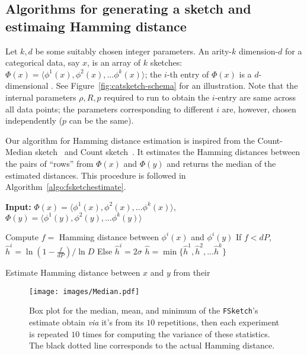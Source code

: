 \subsection{Algorithms for generating a sketch and estimaing Hamming distance}
Let $k,d$ be some suitably chosen integer parameters. An arity-$k$ dimension-$d$ \minfsketch for a categorical data, say $x$, is an array of $k$ sketches: $\Phi(x) = \langle \phi^1(x), \phi^2(x), \ldots \phi^k(x) \rangle$; the $i$-th entry of $\Phi(x)$ is a $d$-dimensional \fsketch. See Figure~\ref{fig:catsketch-schema} for an illustration. Note that the internal parameters $\rho,R,p$ required to run \fsketch to obtain the $i$-entry are same across all data points; the parameters corresponding to different $i$ are, however, chosen independently ($p$ can be the same).

Our algorithm for Hamming distance estimation is inspired from the Count-Median sketch~\cite{CORMODE200558} and Count sketch~\cite{CHARIKAR20043}. It estimates the Hamming distances between the pairs of ``rows'' from $\Phi(x)$ and $\Phi(y)$ and returns the median of the estimated distances. This procedure is followed in Algorithm~\ref{algo:fsketchestimate}.%


\newcommand{\hxy}{\widehat{h}}

    \begin{algorithm}
	\noindent\hspace*{\algorithmicindent} \textbf{Input:} $\Phi(x)=\langle \phi^1(x), \phi^2(x), \ldots \phi^k(x) \rangle$, $\Phi(y)=\langle \phi^1(y), \phi^2(y), \ldots \phi^k(y) \rangle$
	\begin{algorithmic}[1]
            \State Compute $f=$ Hamming distance between $\phi^i(x)$ and $\phi^i(y)$
            \State If $f < dP$, $\hxy^i=\ln\left(1-\frac{f}{dP}\right)/\ln D$
            \State Else $\hxy^i=2\sigma$
        \EndFor
        \State \Return $\hat{h} = \min\{ \hxy^1, \hxy^2, \ldots \hxy^k\}$
	\end{algorithmic}
	\caption{Estimate Hamming distance between $x$ and $y$ from their \minfsketch\label{algo:fsketchestimate}}
    \end{algorithm}
    

\begin{figure*}[t]
\centering
\texttt{[image: images/Median.pdf]}
\caption{{Box plot for the median, mean, and minimum of the \texttt{FSketch}’s estimate obtain \textit{via} it’s from its $10$ repetitions, then each experiment is repeated $10$ times for computing   the variance of these statistics.  The black dotted line corresponds to the actual Hamming distance. }}
\label{fig:box_plot_median_mean_min}
\end{figure*}
    
